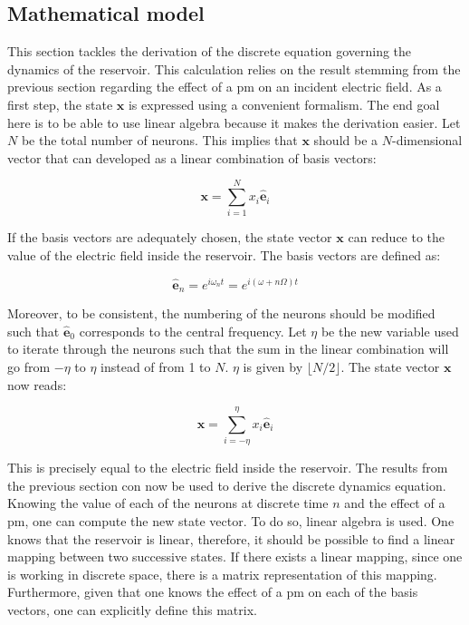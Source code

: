 
\subsection{Mathematical model}

\label{subsec-reservoir-model}

This section tackles the derivation of the discrete equation governing the dynamics of the reservoir. This calculation relies on the result stemming from the previous section regarding the effect of a \gls{pm} on an incident electric field. As a first step, the state $\mathbf{x}$ is expressed using a convenient formalism. The end goal here is to be able to use linear algebra because it makes the derivation easier. Let $N$ be the total number of neurons. This implies that $\mathbf{x}$ should be a $N$-dimensional vector that can developed as a linear combination of basis vectors:

\begin{equation}
	\mathbf{x} = \sum_{i=1}^{N} x_i \hat{\mathbf{e}}_i
\end{equation}

If the basis vectors are adequately chosen, the state vector $\mathbf{x}$ can reduce to the value of the electric field inside the reservoir. The basis vectors are defined as:

\begin{equation}
	\hat{\mathbf{e}}_n = e^{i\omega_nt} = e^{i(\omega+n\Omega)t}
\end{equation}

Moreover, to be consistent, the numbering of the neurons should be modified such that $\hat{\mathbf{e}}_0$ corresponds to the central frequency. Let $\eta$ be the new variable used to iterate through the neurons such that the sum in the linear combination will go from $-\eta$ to $\eta$ instead of from 1 to $N$. $\eta$ is given by $\lfloor N/2 \rfloor$. The state vector $\mathbf{x}$ now reads:

\begin{equation}
	\mathbf{x} = \sum_{i=-\eta}^{\eta} x_i \hat{\mathbf{e}}_i
\end{equation}

This is precisely equal to the electric field inside the reservoir. The results from the previous section con now be used to derive the discrete dynamics equation. Knowing the value of each of the neurons at discrete time $n$ and the effect of a \gls{pm}, one can compute the new state vector. To do so, linear algebra is used. One knows that the reservoir is linear, therefore, it should be possible to find a linear mapping between two successive states. If there exists a linear mapping, since one is working in discrete space, there is a matrix representation of this mapping. Furthermore, given that one knows the effect of a \gls{pm} on each of the basis vectors, one can explicitly define this matrix.

